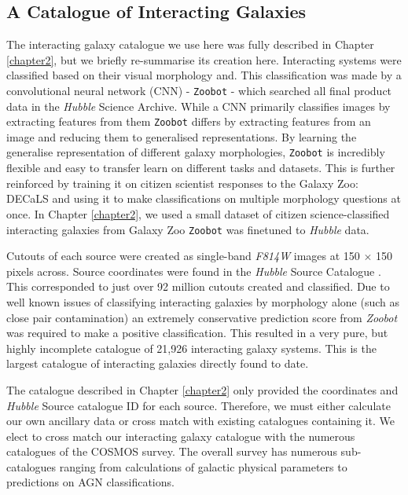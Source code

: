 \subsection{A Catalogue of Interacting Galaxies}
\noindent The interacting galaxy catalogue we use here was fully described in Chapter \ref{chapter2}, but we briefly re-summarise its creation here. Interacting systems were classified based on their visual morphology and. This classification was made by a convolutional neural network (CNN) - \texttt{Zoobot} - which searched all final product data in the \textit{Hubble} Science Archive. While a CNN primarily classifies images by extracting features from them \texttt{Zoobot} differs by extracting features from an image and reducing them to generalised representations. By learning the generalise representation of different galaxy morphologies, \texttt{Zoobot} is incredibly flexible and easy to transfer learn on different tasks and datasets. This is further reinforced by training it on citizen scientist responses to the Galaxy Zoo: DECaLS \citep{2022MNRAS.509.3966W} and using it to make classifications on multiple morphology questions at once. In Chapter \ref{chapter2}, we used a small dataset of citizen science-classified interacting galaxies from Galaxy Zoo \citep{2008MNRAS.389.1179L} \texttt{Zoobot} was finetuned to \textit{Hubble} data.

Cutouts of each source were created as single-band \textit{F814W} images at 150 $\times$ 150 pixels across. Source coordinates were found in the \textit{Hubble} Source Catalogue \citep{2016AJ....151..134W}. This corresponded to just over 92 million cutouts created and classified. Due to well known issues of classifying interacting galaxies by morphology alone (such as close pair contamination) an extremely conservative prediction score from \textit{Zoobot} was required to make a positive classification. This resulted in a very pure, but highly incomplete catalogue of 21,926 interacting galaxy systems. This is the largest catalogue of interacting galaxies directly found to date.

The catalogue described in Chapter \ref{chapter2} only provided the coordinates and \textit{Hubble} Source catalogue ID for each source. Therefore, we must either calculate our own ancillary data or cross match with existing catalogues containing it. We elect to cross match our interacting galaxy catalogue with the numerous catalogues of the COSMOS survey. The overall survey has numerous sub-catalogues ranging from calculations of galactic physical parameters to predictions on AGN classifications. 

